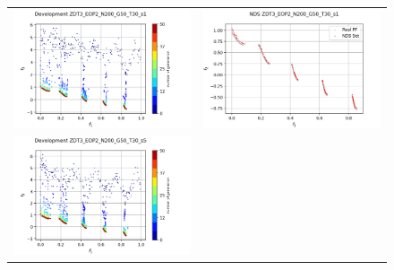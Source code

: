 \begin{figure}[H]
    \centering
    \begin{tabular}{c c}
    \includegraphics[scale=0.5]{figures/ZDT3_EOP2_N200_G50_T30/s1_dev.png} &
    \includegraphics[scale=0.5]{figures/ZDT3_EOP2_N200_G50_T30/s1_nds.png}\\
    \includegraphics[scale=0.5]{figures/ZDT3_EOP2_N200_G50_T30/s5_dev.png} &

\end{tabular}
\end{figure}
